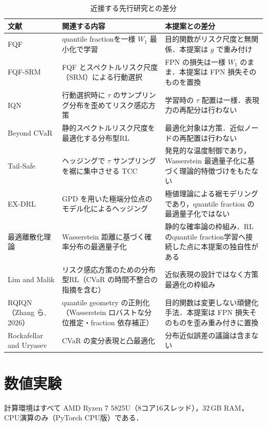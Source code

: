 \documentclass[a4paper,10pt]{jsarticle}
\theoremstyle{definition}
\newcommand{\Wone}{W_1}
\begin{document}
\begin{table}[htbp]
\centering
\caption{近接する先行研究との差分}
\label{tab:novelty}
\small
\setlength{\tabcolsep}{3pt}
\begin{tabular}{p{3.8cm}p{5.0cm}p{5.6cm}}
\toprule
文献 & 関連する内容 & 本提案との差分\\
\midrule
FQF \cite{yang2019fqf} & quantile fractionを一様 $\Wone$ 最小化で学習 & 目的関数がリスク尺度と無関係．本提案は $g$ で重み付け\\
FQF-SRM \cite{gan2026energy} & FQF とスペクトルリスク尺度（SRM）による行動選択 & FPN の損失は一様 $W_1$ のまま．本提案は FPN 損失そのものを置換\\
IQN \cite{dabney2018iqn} & 行動選択時に $\tau$ のサンプリング分布を歪めてリスク感応方策 & 学習時の $\tau$ 配置は一様．表現力の再配分は行わない\\
Beyond CVaR \cite{moghimi2025beyond} & 静的スペクトルリスク尺度を最適化する分布型RL & 最適化対象は方策．近似ノードの再配置は行わない\\
Tail-Safe \cite{zhang2025tailsafe} & ヘッジングで $\tau$ サンプリングを裾に集中させる TCC & 発見的な温度制御であり，Wasserstein 最適量子化に基づく理論的特徴づけをもたない\\
EX-DRL \cite{malekzadeh2024exdrl} & GPD を用いた極端分位点のモデル化によるヘッジング & 極値理論による裾モデリングであり，quantile fraction の最適量子化ではない\\
最適離散化理論 \cite{graf2000quantization,pflug2014multistage} & Wasserstein 距離に基づく確率分布の最適量子化 & 静的な確率論の枠組み．RL のquantile fraction学習へ接続した点に本提案の独自性がある\\
Lim and Malik \cite{lim2022distributional} & リスク感応方策のための分布型RL（CVaR の時間不整合の指摘を含む） & 近似表現の設計ではなく方策最適化の枠組み\\
RQIQN（Zhang ら, 2026）\cite{zhang2026rqiqn} & quantile geometry の正則化（Wasserstein ロバストな分位推定・fraction 依存補正） & 目的関数は変更しない頑健化手法．本提案は FPN 損失そのものを歪み重み付きに置換\\
Rockafellar and Uryasev \cite{rockafellar2000cvar} & CVaR の変分表現と凸最適化 & 分布近似誤差の議論は含まない\\
\bottomrule
\end{tabular}
\end{table}
\section{数値実験}
\label{sec:exp}
計算環境はすべて AMD Ryzen 7 5825U（8コア16スレッド），32\,GB RAM，CPU演算のみ（PyTorch CPU版）である．
\end{document}
